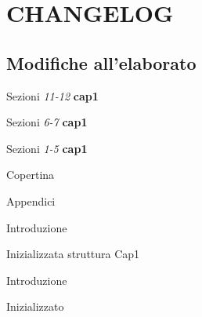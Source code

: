 \chapter*{CHANGELOG}

\section*{Modifiche all'elaborato}\label{chg:UAF}
\begin{changelog}[author=\textit{CGC}]
    \begin{multicols}{2}
   \begin{version}[v=0.5.0, date=2022-09-11]
        \added
        \item Sezioni \textit{11-12} \textbf{cap1}
    \end{version}
    
    \begin{version}[v=0.4.0, date=2022-09-11]
        \added
        \item Sezioni \textit{6-7} \textbf{cap1}
    \end{version}
    
    \begin{version}[v=0.3.0, date=2022-09-10]
        \added
        \item Sezioni \textit{1-5} \textbf{cap1}
    \end{version}
    
    \begin{version}[v=0.2.0, date=2022-09-02]
        \added
        \item Copertina
        \item Appendici
        \changed
        \item Introduzione
    \end{version}

  \begin{version}[v=0.1.0, date=2022-09-01]
      \added
      \item Inizializzata struttura Cap1
      \item Introduzione
      \item Inizializzato
  \end{version}
  


\end{multicols}

\end{changelog}

